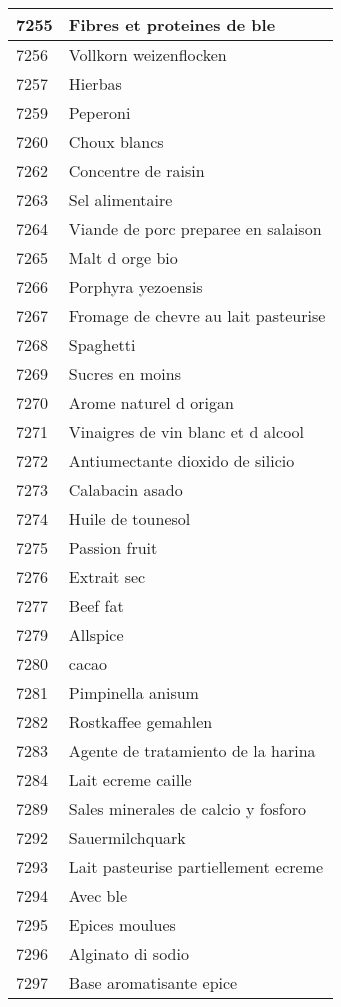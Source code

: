 \begin{longtable}{|l|l|}
7255 & Fibres et proteines de ble \\ \hline 
7256 & Vollkorn weizenflocken \\ \hline 
7257 & Hierbas \\ \hline 
7259 & Peperoni \\ \hline 
7260 & Choux blancs \\ \hline 
7262 & Concentre de raisin \\ \hline 
7263 & Sel alimentaire \\ \hline 
7264 & Viande de porc preparee en salaison \\ \hline 
7265 & Malt d orge bio \\ \hline 
7266 & Porphyra yezoensis \\ \hline 
7267 & Fromage de chevre au lait pasteurise \\ \hline 
7268 & Spaghetti \\ \hline 
7269 & Sucres en moins \\ \hline 
7270 & Arome naturel d origan \\ \hline 
7271 & Vinaigres de vin blanc et d alcool \\ \hline 
7272 & Antiumectante dioxido de silicio \\ \hline 
7273 & Calabacin asado \\ \hline 
7274 & Huile de tounesol \\ \hline 
7275 & Passion fruit \\ \hline 
7276 & Extrait sec \\ \hline 
7277 & Beef fat \\ \hline 
7279 & Allspice \\ \hline 
7280 & cacao \\ \hline 
7281 & Pimpinella anisum \\ \hline 
7282 & Rostkaffee gemahlen \\ \hline 
7283 & Agente de tratamiento de la harina \\ \hline 
7284 & Lait ecreme caille \\ \hline 
7289 & Sales minerales de calcio y fosforo \\ \hline 
7292 & Sauermilchquark \\ \hline 
7293 & Lait pasteurise partiellement ecreme \\ \hline 
7294 & Avec ble \\ \hline 
7295 & Epices moulues \\ \hline 
7296 & Alginato di sodio \\ \hline 
7297 & Base aromatisante epice \\ \hline 

\end{longtable}
